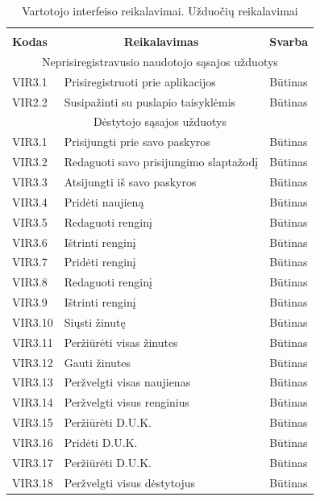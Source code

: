 \documentclass{VUMIFPSkursinis}
\begin{document}
\begin{longtable}{|p{2cm}|p{}|p{2cm}|}\toprule
	\caption{Vartotojo interfeiso reikalavimai. Užduočių reikalavimai}\\
	\hline  \rowcolor{lightgray} 
	\multicolumn{3}{|c|}{2. Užduočių reikalavimai}\\ \hline 
	\multicolumn{1}{|l|}{\textbf{Kodas}} & \multicolumn{1}{c|}{\textbf{Reikalavimas}} & \multicolumn{1}{c|}{\textbf{Svarba}} \\ \hline 
	\multicolumn{3}{|c|}{Neprisiregistravusio naudotojo sąsajos užduotys}\\ \hline
	{VIR3.1}&{Prisiregistruoti prie aplikacijos}&{Būtinas} \\ \hline
	{VIR2.2}&{Susipažinti su puslapio taisyklėmis}&{Būtinas}\\ \hline
	\multicolumn{3}{|c|}{Dėstytojo sąsajos užduotys}\\ \hline
	{VIR3.1}&{Prisijungti prie savo paskyros}&{Būtinas}\\ \hline
	{VIR3.2}&{Redaguoti savo prisijungimo slaptažodį}&{Būtinas}\\ \hline
	{VIR3.3}&{Atsijungti iš savo paskyros}&{Būtinas}\\ \hline
	{VIR3.4}&{Pridėti naujieną}&{Būtinas}\\ 	\hline
	{VIR3.5}&{Redaguoti renginį}&{Būtinas}\\	\hline
	{VIR3.6}&{Ištrinti renginį}&{Būtinas}\\ 	\hline
	{VIR3.7}&{Pridėti renginį}&{Būtinas}\\ 	\hline
	{VIR3.8}&{Redaguoti renginį}&{Būtinas}\\ 	\hline
	{VIR3.9}&{Ištrinti renginį}&{Būtinas}\\	\hline
	{VIR3.10}&{Siųsti žinutę}&{Būtinas}\\ 	\hline
	{VIR3.11}&{Peržiūrėti visas žinutes}&{Būtinas}\\ 	\hline
	{VIR3.12}&{Gauti žinutes}&{Būtinas}\\ 	\hline
	{VIR3.13}&{Peržvelgti visas naujienas}&{Būtinas}\\	\hline
	{VIR3.14}&{Peržvelgti visus renginius}&{Būtinas}\\	\hline
	{VIR3.15}&{Peržiūrėti D.U.K.}&{Būtinas}\\	\hline
	{VIR3.16}&{Pridėti D.U.K.}&{Būtinas}\\ 	\hline
	{VIR3.17}&{Peržiūrėti D.U.K.}&{Būtinas}\\	\hline
	{VIR3.18}&{Peržvelgti visus dėstytojus}&{Būtinas}\\ 	\hline

\end{longtable}
\end{document}
